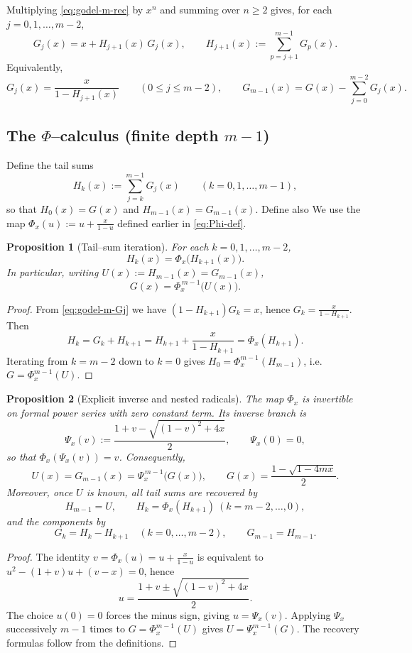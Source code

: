 \documentclass[11pt]{article}
\newtheorem{proposition}{Proposition}
\begin{document}
Multiplying \eqref{eq:godel-m-rec} by \(x^n\) and summing over \(n\ge2\) gives, for each \(j=0,1,\dots,m-2\),
\begin{equation}\label{eq:godel-m-Gj}
G_j(x)=x+H_{j+1}(x)\,G_j(x),
\qquad
H_{j+1}(x):=\sum_{p=j+1}^{m-1}G_p(x).
\end{equation}
Equivalently,
\[
G_j(x)=\frac{x}{1-H_{j+1}(x)}\qquad (0\le j\le m-2),
\qquad
G_{m-1}(x)=G(x)-\sum_{j=0}^{m-2}G_j(x).
\]

\subsection*{The $\Phi$--calculus (finite depth \(m-1\))}
Define the tail sums
\[
H_k(x):=\sum_{j=k}^{m-1}G_j(x)\qquad (k=0,1,\dots,m-1),
\]
so that \(H_0(x)=G(x)\) and \(H_{m-1}(x)=G_{m-1}(x)\). Define also
We use the map $\Phi_x(u):=u+\frac{x}{1-u}$ defined earlier in \eqref{eq:Phi-def}.

\begin{proposition}[Tail--sum iteration]\label{prop:godel-m-phi}
For each \(k=0,1,\dots,m-2\),
\[
H_k(x)=\Phi_x\!\big(H_{k+1}(x)\big).
\]
In particular, writing \(U(x):=H_{m-1}(x)=G_{m-1}(x)\),
\[
\boxed{\,G(x)=\Phi_x^{\,m-1}\!\big(U(x)\big).\,}
\]
\end{proposition}

\begin{proof}
From \eqref{eq:godel-m-Gj} we have \((1-H_{k+1})G_k=x\), hence \(G_k=\frac{x}{1-H_{k+1}}\).
Then
\[
H_k=G_k+H_{k+1}=H_{k+1}+\frac{x}{1-H_{k+1}}=\Phi_x(H_{k+1}).
\]
Iterating from \(k=m-2\) down to \(k=0\) gives \(H_0=\Phi_x^{m-1}(H_{m-1})\), i.e.
\(G=\Phi_x^{m-1}(U)\).
\end{proof}

\begin{proposition}[Explicit inverse and nested radicals]\label{prop:godel-m-psi}
The map \(\Phi_x\) is invertible on formal power series with zero constant term. Its inverse
branch is
\[
\Psi_x(v):=\frac{1+v-\sqrt{(1-v)^2+4x}}{2},
\qquad \Psi_x(0)=0,
\]
so that \(\Phi_x(\Psi_x(v))=v\). Consequently,
\[
\boxed{\,U(x)=G_{m-1}(x)=\Psi_x^{\,m-1}\!\big(G(x)\big),\qquad
G(x)=\frac{1-\sqrt{1-4mx}}{2}.\,}
\]
Moreover, once \(U\) is known, all tail sums are recovered by
\[
H_{m-1}=U,\qquad H_k=\Phi_x(H_{k+1})\ (k=m-2,\dots,0),
\]
and the components by
\[
G_k=H_k-H_{k+1}\quad (k=0,\dots,m-2),\qquad G_{m-1}=H_{m-1}.
\]
\end{proposition}

\begin{proof}
The identity \(v=\Phi_x(u)=u+\frac{x}{1-u}\) is equivalent to
\(u^2-(1+v)u+(v-x)=0\), hence
\[
u=\frac{1+v\pm\sqrt{(1-v)^2+4x}}{2}.
\]
The choice \(u(0)=0\) forces the minus sign, giving \(u=\Psi_x(v)\). Applying \(\Psi_x\)
successively \(m-1\) times to \(G=\Phi_x^{m-1}(U)\) gives \(U=\Psi_x^{m-1}(G)\).
The recovery formulas follow from the definitions.
\end{proof}
\end{document}
